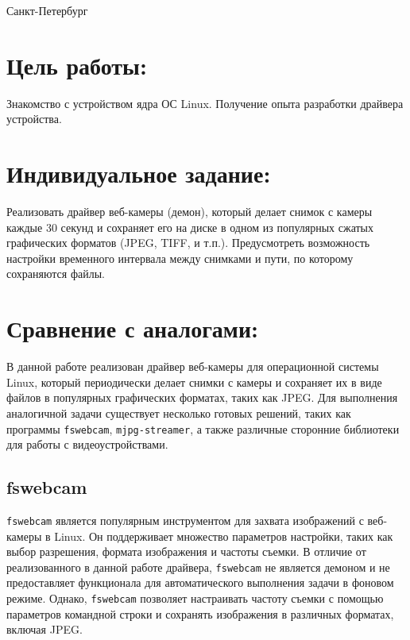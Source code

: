 \documentclass[12pt]{article}
\begin{document}


\vspace{\baselineskip}
\vspace{\baselineskip}
\vspace{\baselineskip}
\vspace{\baselineskip}
\vspace{\baselineskip}
\begin{Center}
Санкт-Петербург \the\year{}
\end{Center}\par

\newpage

\section*{Цель работы:}

Знакомство с устройством ядра ОС Linux. Получение опыта разработки драйвера устройства.

\section*{Индивидуальное задание:}

Реализовать драйвер веб-камеры (демон), который делает снимок с камеры каждые 30 секунд и сохраняет его на диске в одном из популярных сжатых графических форматов (JPEG, TIFF, и т.п.). Предусмотреть возможность настройки временного интервала между снимками и пути, по которому сохраняются файлы.

\section*{Сравнение с аналогами:}

В данной работе реализован драйвер веб-камеры для операционной системы Linux, который периодически делает снимки с камеры и сохраняет их в виде файлов в популярных графических форматах, таких как JPEG. Для выполнения аналогичной задачи существует несколько готовых решений, таких как программы \texttt{fswebcam}, \texttt{mjpg-streamer}, а также различные сторонние библиотеки для работы с видеоустройствами.

\subsection*{fswebcam}
\texttt{fswebcam} является популярным инструментом для захвата изображений с веб-камеры в Linux. Он поддерживает множество параметров настройки, таких как выбор разрешения, формата изображения и частоты съемки. В отличие от реализованного в данной работе драйвера, \texttt{fswebcam} не является демоном и не предоставляет функционала для автоматического выполнения задачи в фоновом режиме. Однако, \texttt{fswebcam} позволяет настраивать частоту съемки с помощью параметров командной строки и сохранять изображения в различных форматах, включая JPEG.
\end{document}
